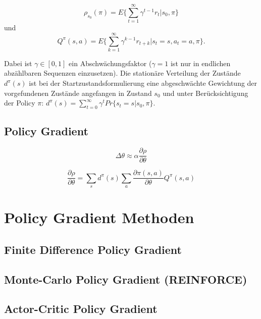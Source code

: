 \documentclass[conference]{IEEEtran}
\begin{document}
\begin{equation*}
\rho_{s_0}(\pi) = E\{\sum^\infty_{t=1} \gamma^{t-1} r_t | s_0,\pi \}
\end{equation*}
und
\begin{equation*}
Q^\pi (s,a) = E \{\sum^\infty_{k=1} \gamma^{k-1} r_{t+k} | s_t = s, a_t = a, \pi\}.
\end{equation*}

Dabei ist $\gamma \in [0,1]$ ein Abschwächungsfaktor ($\gamma = 1$ ist nur in endlichen abzählbaren Sequenzen einzusetzen). Die stationäre Verteilung der Zustände $d^\pi (s)$ ist bei der Startzustandsformulierung eine abgeschwächte Gewichtung der vorgefundenen Zustände angefangen in Zustand $s_0$ und unter Berücksichtigung der Policy $\pi$: $d^\pi (s) = \sum^\infty_{t=0} \gamma^t Pr \{s_t = s | s_0, \pi\}$.
 
\subsection{Policy Gradient}

\begin{equation}
\Delta \theta \approx \alpha \frac{\partial \rho}{\partial \theta}
\end{equation}

\begin{equation}
\frac{\partial \rho}{\partial \theta} = 
\sum_s d^\pi (s) \sum_a \frac{\partial \pi (s,a)}{\partial \theta} 
Q^\pi (s,a)
\end{equation}

\section{Policy Gradient Methoden}

\subsection{Finite Difference Policy Gradient}

\subsection{Monte-Carlo Policy Gradient (REINFORCE)}

\subsection{Actor-Critic Policy Gradient}


\end{document}
